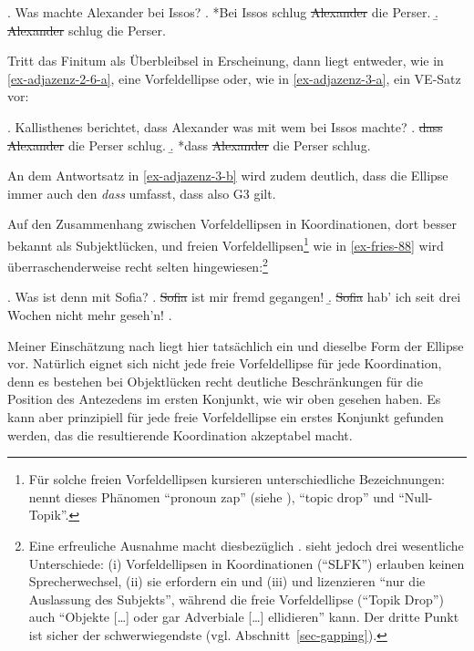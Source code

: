 \ex. \label{ex-adjazenz-2-6} Was machte Alexander bei Issos? 
\a.  *Bei Issos schlug \sout{Alexander} die Perser.\label{ex-adjazenz-2-6-b}
\b.  \sout{Alexander} schlug die Perser.\label{ex-adjazenz-2-6-a}

Tritt das Finitum als Überbleibsel in Erscheinung, dann liegt entweder, wie in \ref{ex-adjazenz-2-6-a}, eine Vorfeldellipse oder, wie in  \ref{ex-adjazenz-3-a}, ein VE-Satz vor:

\ex. \label{ex-adjazenz-3}Kallisthenes berichtet, dass Alexander was mit wem bei Issos machte?
\a. \sout{dass Alexander} die Perser schlug.\label{ex-adjazenz-3-a}
\b. *dass \sout{Alexander} die Perser schlug.\label{ex-adjazenz-3-b}

An dem Antwortsatz in \ref{ex-adjazenz-3-b} wird zudem deutlich, dass die Ellipse immer auch den  {\it dass} umfasst, dass also G3 gilt.

Auf den Zusammenhang zwischen Vorfeldellipsen in Koordinationen, dort besser bekannt als Subjektlücken, und freien Vorfeldellipsen\footnote{Für solche freien Vorfeldellipsen kursieren unterschiedliche Bezeichnungen: \cite{Ross:82} nennt dieses Phänomen "`pronoun zap"' (siehe \citealt{Huang:84}), \cite{Oirsouw:87} "`topic drop"' und \cite{Fries:88} "`Null-Topik"'.} wie in \ref{ex-fries-88} wird überraschenderweise recht selten hingewiesen:\footnote{Eine erfreuliche Ausnahme macht diesbezüglich \citet[136ff]{Oirsouw:87}. \citet[153]{Reich:09} sieht jedoch drei wesentliche Unterschiede: (i) Vorfeldellipsen in Koordinationen ("`SLFK"') erlauben keinen Sprecherwechsel, (ii) sie erfordern ein  und (iii) und lizenzieren "`nur die Auslassung des Subjekts"', während die freie Vorfeldellipse ("`Topik Drop"') auch "`Objekte [\ldots] oder gar Adverbiale [\ldots] ellidieren"' kann. Der dritte Punkt ist sicher der schwerwiegendste (vgl. Abschnitt~\ref{sec-gapping}).}  

\ex. \label{ex-fries-88}Was ist denn mit Sofia?
\a. \sout{Sofia} ist mir fremd gegangen!
\b. \sout{Sofia} hab' ich seit drei Wochen nicht mehr geseh'n!
\z. \cite[(1)--(3)]{Fries:88} 

Meiner Einschätzung nach liegt hier tatsächlich ein und dieselbe Form der Ellipse vor. Natürlich eignet sich nicht jede freie Vorfeldellipse für jede Koordination, denn es bestehen bei Objektlücken recht deutliche Beschränkungen für die Position des  Antezedens im ersten Konjunkt, wie wir oben gesehen haben. Es kann aber prinzipiell für jede freie Vorfeldellipse ein erstes Konjunkt gefunden werden, das die resultierende Koordination akzeptabel macht.  

